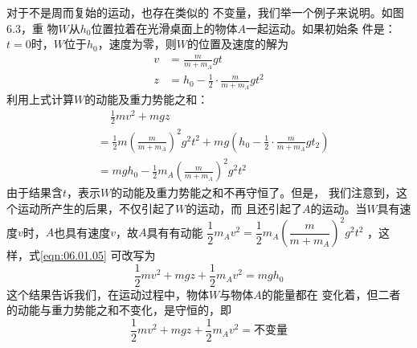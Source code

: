 对于不是周而复始的运动，也存在类似的
不变量，我们举一个例子来说明。如图6.3，重
物$ W $从$ h _ { 0 } $位置拉着在光滑桌面上的物体$ A $一起运动。如果初始条
件是：$ t = 0 $时，$ W $位于$ h _ { 0 } $，速度为零，则$ W $的位置及速度的解为
\begin{equation*}
  \begin{aligned}
    v & = \frac { m } { m + m _ { A } } g t                                             \\
    z & = h _ { 0 } - \frac { 1 } { 2 } \cdot \frac { m } { m + m _ { A } } g t ^ { 2 }
  \end{aligned}
\end{equation*}
利用上式计算$ W $的动能及重力势能之和：
{\setlength{\mathindent}{2em}
\begin{equation}\label{eqn:06.01.05}
  \begin{aligned}
     & \quad \, \frac { 1 } { 2 } m v ^ { 2 } + m g z                                                                                                                                                    \\
     & = \frac { 1 } { 2 } m \left( \frac { m } { m + m _ { A } } \right) ^ { 2 } g ^ { 2 } t ^ { 2 } + m g \left( h _ { 0 } - \frac { 1 } { 2 } \cdot \frac { m } { m + m _ { A } } g t _ { 2 } \right) \\
     & = m g h _ { 0 } - \frac { 1 } { 2 } m _ { A } \left( \frac { m } { m + m _ { A } } \right) ^ { 2 } g ^ { 2 } t ^ { 2 }
  \end{aligned}
\end{equation}}
由于结果含$ t $，表示$ W $的动能及重力势能之和不再守恒了。但是，
我们注意到，这个运动所产生的后果，不仅引起了$ W $的运动，而
且还引起了$ A $的运动。当$ W $具有速度$ v $时，$ A $也具有速度$ v $，故$ A $具有有动能
$ \dfrac { 1 } { 2 } m _ { A } v ^ { 2 } = \dfrac { 1 } { 2 } m _ { A } \left( \dfrac { m } { m + m _ { A } } \right) ^ { 2 } g ^ { 2 } t ^ { 2 } $
，这样，式\eqref{eqn:06.01.05}
可改写为
\begin{equation*}
  \frac { 1 } { 2 } m v ^ { 2 } + m g z + \frac { 1 } { 2 } m _ { A } v ^ { 2 } = m g h _ { 0 }
\end{equation*}
这个结果告诉我们，在运动过程中，物体$ W $与物体$ A $的能量都在
变化着，但二者的动能与重力势能之和不变化，是守恒的，即
\begin{equation}\label{eqn:06.01.06}
  \frac { 1 } { 2 } m v ^ { 2 } + m g z + \frac { 1 } { 2 } m _ { A } v ^ { 2 } = \text{不变量}
\end{equation}

